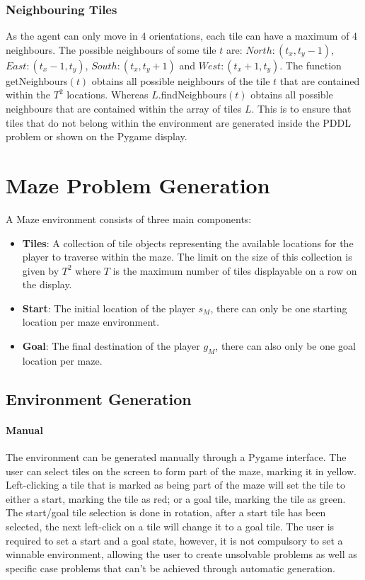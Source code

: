 \subsubsection{Neighbouring Tiles}
As the agent can only move in 4 orientations, each tile can have a maximum of 4 neighbours. The possible neighbours of some tile $t$ are: $North: (t_x, t_y - 1)$, $East: (t_x - 1, t_y)$, 
$South: (t_x, t_y + 1)$ and $West: (t_x + 1, t_y)$. The function getNeighbours$(t)$ obtains all possible neighbours of the tile $t$ that are contained within the $T^2$ locations. Whereas $L.$findNeighbours$(t)$ obtains all possible neighbours that are contained within the array of tiles $L$. This is to ensure that tiles that do not belong within the environment are generated inside the PDDL problem or shown on the Pygame display.

\newpage
\section{Maze Problem Generation}
A Maze environment consists of three main components:

\begin{itemize}
    \item \textbf{Tiles}: A collection of tile objects representing the available locations for the player to traverse within the maze. The limit on the size of this collection is given by $T^2$  where $T$ is the maximum number of tiles displayable on a row on the display.
    \item \textbf{Start}: The initial location of the player $s_M$, there can only be one starting location per maze environment.
    \item \textbf{Goal}: The final destination of the player $g_M$, there can also only be one goal location per maze.
\end{itemize}

\subsection{Environment Generation}
\paragraph{Manual}
The environment can be generated manually through a Pygame interface. The user can select tiles on the screen to form part of the maze, marking it in yellow. Left-clicking a tile that is marked as being part of the maze will set the tile to either a start, marking the tile as red; or a goal tile, marking the tile as green. The start/goal tile selection is done in rotation, after a start tile has been selected, the next left-click on a tile will change it to a goal tile. The user is required to set a start and a goal state, however, it is not compulsory to set a winnable environment, allowing the user to create unsolvable problems as well as specific case problems that can't be achieved through automatic generation.

